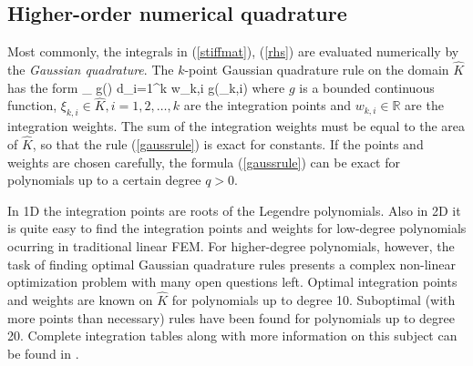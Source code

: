 \subsection{Higher-order numerical quadrature}
\label{sec:numquad}

Most commonly, the integrals in (\ref{stiffmat}), (\ref{rhs}) are evaluated
numerically by the \emph{Gaussian quadrature}. The $k$-point Gaussian quadrature
rule on the domain $\hat{K}$ has the form
\be \label{gaussrule}
  \int_{} g(\xi) \mbox{d}\xi \approx \sum_{i=1}^k w_{k,i} g(\xi_{k,i})
\ee
where $g$ is a bounded continuous function, $\xi_{k,i} \in \hat{K}, i = 1,2,\dots,k$ are
the integration points and $w_{k,i} \in \mathbb{R}$ are the integration weights.
The sum of the integration weights must be equal to the area of $\hat{K}$, so that
the rule (\ref{gaussrule}) is exact for constants. If the points and weights are
chosen carefully, the formula (\ref{gaussrule}) can be exact for polynomials
up to a certain degree $q > 0$.

In 1D the integration points are roots of the Legendre polynomials. Also in 2D
it is quite easy to find the integration points and weights for low-degree polynomials
ocurring in traditional linear FEM. For higher-degree polynomials, however, the
task of finding optimal Gaussian quadrature rules presents a complex non-linear
optimization problem with many open questions left. Optimal integration points
and weights are known on $\hat{K}$ for polynomials up to degree 10. Suboptimal (with
more points than necessary) rules have been found for polynomials up to degree 20.
Complete integration tables along with more information on this subject 
can be found in \cite{solin1}.
